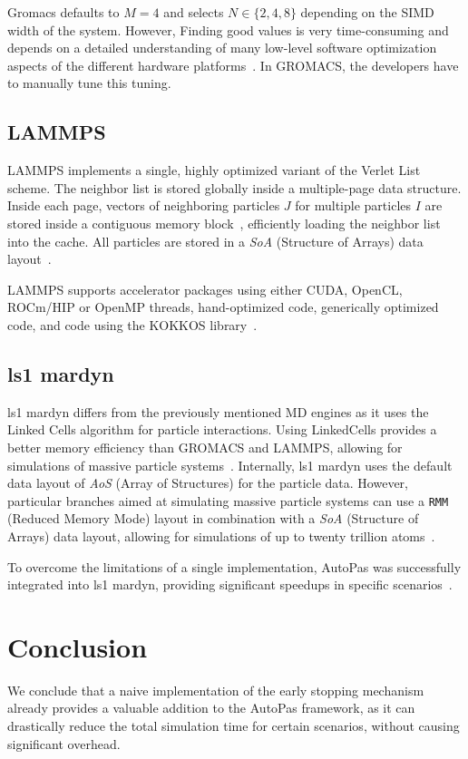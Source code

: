 \documentclass[conference]{IEEEtran}
\begin{document}
Gromacs defaults to $M=4$ and selects $N \in \{2, 4, 8\}$ depending on the SIMD width of the system. However, Finding good values is very time-consuming and depends on a detailed understanding of many low-level software optimization aspects of the different hardware platforms~\cite{PALL20132641}. In GROMACS, the developers have to manually tune this tuning.

\subsection{LAMMPS}

LAMMPS implements a single, highly optimized variant of the Verlet List scheme. The neighbor list is stored globally inside a multiple-page data structure. Inside each page, vectors of neighboring particles $J$ for multiple particles $I$ are stored inside a contiguous memory block~\cite{THOMPSON2022108171}, efficiently loading the neighbor list into the cache.
All particles are stored in a \textit{SoA} (Structure of Arrays) data layout~\cite{THOMPSON2022108171}.

LAMMPS supports accelerator packages using either CUDA, OpenCL, ROCm/HIP or OpenMP threads, hand-optimized
code, generically optimized code, and code using the KOKKOS library~\cite{Seckler2021}.


\subsection{ls1 mardyn}

ls1 mardyn differs from the previously mentioned MD engines as it uses the Linked Cells algorithm for particle interactions. Using LinkedCells provides a better memory efficiency than GROMACS and LAMMPS, allowing for simulations of massive particle systems~\cite{tchipev2019twe}. Internally, ls1 mardyn uses the default data layout of \textit{AoS} (Array of Structures) for the particle data. However, particular branches aimed at simulating massive particle systems can use a \texttt{RMM} (Reduced Memory Mode) layout in combination with a \textit{SoA} (Structure of Arrays) data layout, allowing for simulations of up to twenty trillion atoms~\cite{tchipev2019twe}.

To overcome the limitations of a single implementation, AutoPas was successfully integrated into ls1 mardyn, providing significant speedups in specific scenarios~\cite{SECKLER2021101296}.


\section{Conclusion}

We conclude that a naive implementation of the early stopping mechanism already provides a valuable addition to the AutoPas framework, as it can drastically reduce the total simulation time for certain scenarios, without causing significant overhead.








\newpage
\newpage
\tableofcontents
\end{document}
